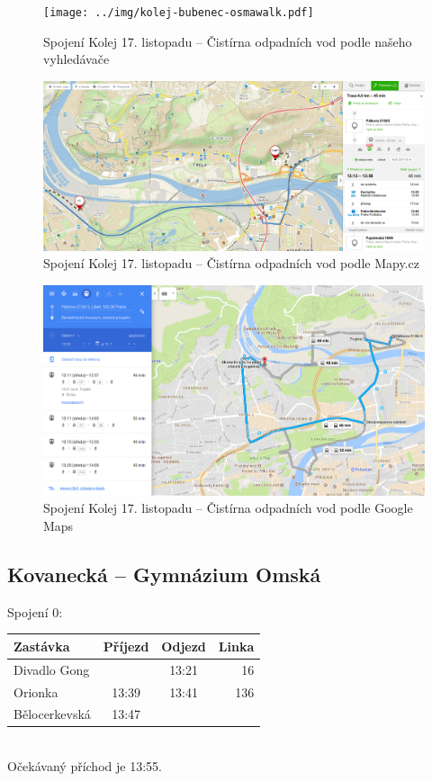 \begin{figure}[h]
  \centering
    \texttt{[image: ../img/kolej-bubenec-osmawalk.pdf]}
  \caption{Spojení Kolej 17. listopadu -- Čistírna odpadních vod podle našeho
  vyhledávače}
  \label{fig:kolej-bubenec-osmawalk}
\end{figure}
\begin{figure}[h]
  \centering
    \includegraphics[width=\textwidth]{../img/kolej-bubenec-seznam.png}
  \caption{Spojení Kolej 17. listopadu -- Čistírna odpadních vod podle Mapy.cz}
  \label{fig:kolej-bubenec-seznam}
\end{figure}
\begin{figure}[h]
  \centering
    \includegraphics[width=\textwidth]{../img/kolej-bubenec-google.png}
  \caption{Spojení Kolej 17. listopadu -- Čistírna odpadních vod podle Google
  Maps}
  \label{fig:kolej-bubenec-google}
\end{figure}

\clearpage
\subsection{Kovanecká -- Gymnázium Omská}
Spojení 0:\\[2mm]
\begin{tabular}{|l|c|c|r|}\hline
{\bf Zastávka}&{\bf Příjezd}&{\bf Odjezd}&{\bf Linka}\\\hline
Divadlo Gong&&13:21&16\\\hline
Orionka&13:39&13:41&136\\\hline
Bělocerkevská&13:47&&\\\hline
\end{tabular}\\[2mm]
Očekávaný příchod je 13:55.
 
